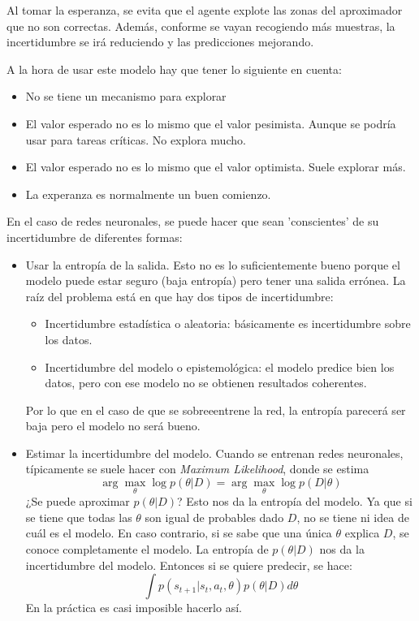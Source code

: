 Al tomar la esperanza, se evita que el agente explote las zonas del aproximador que no son
correctas. Además, conforme se vayan recogiendo más muestras, la incertidumbre se irá reduciendo y
las predicciones mejorando.

A la hora de usar este modelo hay que tener lo siguiente en cuenta:
\begin{itemize}
    \item No se tiene un mecanismo para explorar
    \item El valor esperado no es lo mismo que el valor pesimista. Aunque se podría usar para
        tareas críticas. No explora mucho.
    \item El valor esperado no es lo mismo que el valor optimista. Suele explorar más.
    \item La experanza es normalmente un buen comienzo.
\end{itemize}

En el caso de redes neuronales, se puede hacer que sean 'conscientes' de su incertidumbre de
diferentes formas:
\begin{itemize}
    \item Usar la entropía de la salida. Esto no es lo suficientemente bueno porque el modelo
        puede estar seguro (baja entropía) pero tener una salida errónea. La raíz del problema
        está en que hay dos tipos de incertidumbre:
        \begin{itemize}
            \item Incertidumbre estadística o aleatoria: básicamente es incertidumbre sobre
                los datos.
            \item Incertidumbre del modelo o epistemológica: el modelo predice bien los datos, pero
                con ese modelo no se obtienen resultados coherentes.
        \end{itemize}
        Por lo que en el caso de que se sobreeentrene la red, la entropía parecerá ser baja
        pero el modelo no será bueno.
    \item Estimar la incertidumbre del modelo. Cuando se entrenan redes neuronales,
        típicamente se suele hacer con \textit{Maximum Likelihood}, donde se estima
        \[
\operatorname { arg } \operatorname { max } _ { \theta } \operatorname { log } p ( \theta | D ) = \operatorname { arg } \operatorname { max } _ { \theta } \operatorname { log } p ( D | \theta )
        \] 
        ¿Se puede aproximar $p(\theta|D)$? Esto nos da la entropía del modelo. Ya que si se
        tiene que todas las  $\theta$ son igual de probables dado $D$, no se tiene ni idea de
        cuál es el modelo. En caso contrario, si se sabe que una única $\theta$ explica
        $D$, se conoce completamente el modelo. La entropía de $p(\theta|D)$ nos da la
        incertidumbre del modelo. Entonces si se quiere predecir, se hace:
        \[
\int p ( s _ { t + 1 } | s _ { t } , a _ { t } , \theta ) p ( \theta | D ) d \theta
        \] 
        En la práctica es casi imposible hacerlo así.
\end{itemize}

